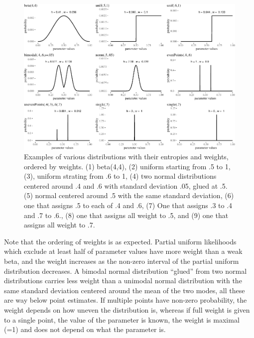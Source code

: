\documentclass[
  10pt,
  dvipsnames,enabledeprecatedfontcommands]{scrartcl}
\begin{document}
\begin{figure}[H]

\begin{center}\includegraphics[width=1\linewidth]{impreciseEpistemicFINAL_files/figure-latex/fig:weightsWeird-1} \end{center}
\caption{Examples of various distributions with their entropies and weights, ordered by weights. (1) beta(4,4), (2) uniform starting from .5 to 1, (3), uniform strating from .6 to 1, (4) two normal distributions centered around .4 and .6 with standard deviation .05, glued at .5. (5) normal centered around .5 with the same standard deviation, (6) one that assigns .5 to each of .4  and .6, (7) One that assigns .3 to .4 and .7 to .6., (8) one that assigns all weight to .5, and (9) one that assigns all weight to .7.}

\label{fig:weightsWeird}
\end{figure}

Note that the ordering of weights is as expected. Partial uniform
likelihoods which exclude at least half of parameter values have more
weight than a weak beta, and the weight increases as the non-zero
interval of the partial uniform distribution decreases. A bimodal normal
distribution ``glued'' from two normal distributions carries less weight
than a unimodal normal distribution with the same standard deviation
centered around the mean of the two modes, all these are way below point
estimates. If multiple points have non-zero probability, the weight
depends on how uneven the distribution is, whereas if full weight is
given to a single point, the value of the parameter is known, the weight
is maximal (=1) and does not depend on what the parameter is.
\end{document}
